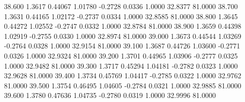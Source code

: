   38.600   1.3617   0.44067   1.01780  -0.2728   0.0336   1.0000  32.8377  81.0000
  38.700   1.3631   0.44165   1.02172  -0.2737   0.0334   1.0000  32.8585  81.0000
  38.800   1.3645   0.44272   1.02552  -0.2747   0.0332   1.0000  32.8784  81.0000
  38.900   1.3659   0.44398   1.02919  -0.2755   0.0330   1.0000  32.8974  81.0000
  39.000   1.3673   0.44544   1.03269  -0.2764   0.0328   1.0000  32.9154  81.0000
  39.100   1.3687   0.44726   1.03600  -0.2771   0.0326   1.0000  32.9324  81.0000
  39.200   1.3701   0.44965   1.03906  -0.2777   0.0325   1.0000  32.9482  81.0000
  39.300   1.3717   0.45294   1.04181  -0.2782   0.0323   1.0000  32.9628  81.0000
  39.400   1.3734   0.45769   1.04417  -0.2785   0.0322   1.0000  32.9762  81.0000
  39.500   1.3754   0.46495   1.04605  -0.2784   0.0321   1.0000  32.9885  81.0000
  39.600   1.3780   0.47636   1.04735  -0.2780   0.0319   1.0000  32.9996  81.0000
